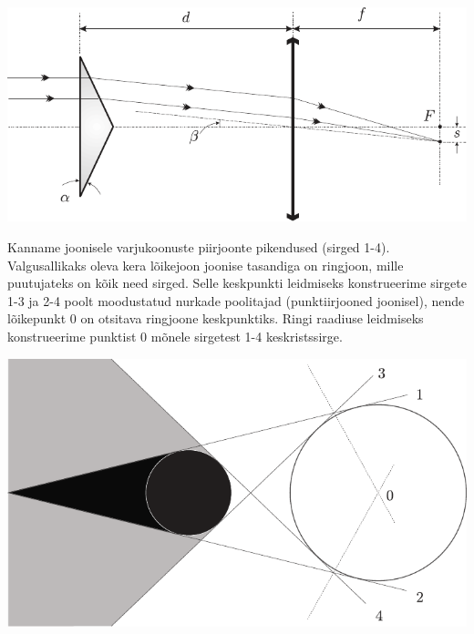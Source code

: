 \documentclass[10pt, twoside]{article}
\begin{document}
{\begin{center}
	\includegraphics[width=\linewidth]{2006-v2g-06-lah}
\end{center}
\probend
\bigskip


\solu
Kanname joonisele varjukoonuste piirjoonte pikendused (sirged 1-4). Valgusallikaks oleva kera lõikejoon joonise tasandiga on ringjoon, mille puutujateks on kõik need sirged. Selle keskpunkti leidmiseks konstrueerime sirgete 1-3 ja 2-4 poolt moodustatud nurkade poolitajad (punktiirjooned joonisel), nende lõikepunkt 0 on otsitava ringjoone keskpunktiks. Ringi raadiuse leidmiseks konstrueerime punktist 0 mõnele sirgetest 1-4 keskristssirge.

\begin{center}
	\includegraphics[width=\textwidth]{2007-v2g-06-lah}
\end{center}
\probend
\bigskip


}
\end{document}
